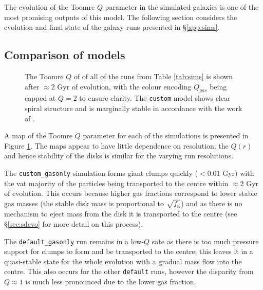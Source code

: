 The evolution of the Toomre $Q$ parameter in the simulated galaxies is one of the most promising outputs of this model.
The following section considers the evolution and final state of the galaxy runs presented in \S \ref{app:sims}.

\subsection{Comparison of models}

\begin{figure}[!ht]
    \leavevmode\rlap{\usebox{\graphicsbox}}%
    \begin{minipage}[b]{0.63\wd\graphicsbox}%
        \caption{The Toomre $Q$ of of all of the runs from Table \ref{tab:sims} is shown after $\approx 2$ Gyr of evolution, with the colour encoding $Q_{gas}$ being capped at $Q=2$ to ensure clarity. The {\tt custom} model shows clear spiral structure and is marginally stable in accordance with the work of \citet{hopkins_stellar_2012}.}
        \label{fig:toomqsimbigfig}
    \end{minipage}\hspace*{0.33\wd\graphicsbox}%
\end{figure}

A map of the Toomre $Q$ parameter for each of the simulations is presented in Figure \ref{fig:toomqsimbigfig}.
The maps appear to have little dependence on resolution; the $Q(r)$ and hence stability of the disks is similar for the varying run resolutions.

The {\tt custom\_gasonly} simulation forms giant clumps quickly ($<0.01$ Gyr) with the vat majority of the particles being transported to the centre within $\approx 2$ Gyr of evolution.
This occurs because higher gas fractions correspond to lower stable gas masses (the stable disk mass is proportional to $\sqrt{f_\mathrm{g}}$) and as there is no mechanism to eject mass from the disk it is transported to the centre (see \S \ref{sec:sdevo} for more detail on this process).

The {\tt default\_gasonly} run remains in a low-$Q$ sate as there is too much pressure support for clumps to form and be transported to the centre; this leaves it in a quasi-stable state for the whole evolution with a gradual mass flow into the centre.
This also occurs for the other {\tt default} runs, however the disparity from $Q \approx 1$ is much less pronounced due to the lower gas fraction.

